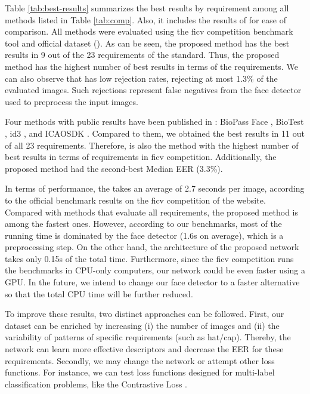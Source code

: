 Table \ref{tab:best-results} summarizes the best results by requirement among all methods listed in Table \ref{tab:comp}. Also, it includes the results of \methodname for ease of comparison. All methods were evaluated using the \acs{ficv} competition benchmark tool and official dataset (\ficvofficial). As can be seen, the proposed method has the best results in 9 out of the 23 requirements of the \icao standard. Thus, the proposed method has the highest number of best results in terms of the requirements. We can also observe that \methodname has low rejection rates, rejecting at most 1.3\% of the evaluated images. Such rejections represent false negatives from the face detector used to preprocess the input images.
 

 
Four methods with public results have been published in \fvcongoing: BioPass Face \citep{fvcVsoft}, BioTest \citep{fvcBioTest}, id3 \citep{fvcICAOCompliance}, and ICAOSDK \citep{fvcSeamfix}. Compared to them, we obtained the best results in 11 out of all 23 requirements. Therefore, \methodname is also the method with the highest number of best results in terms of requirements in \acs{ficv} competition. Additionally, the proposed method had the second-best Median EER (3.3\%).
 
In terms of performance, the \methodname takes an average of 2.7 seconds per image, according to the official benchmark results on the \acs{ficv} competition of the \fvcongoing website. Compared with methods that evaluate all requirements, the proposed method is among the fastest ones. However, according to our benchmarks, most of the running time is dominated by the face detector (1.6s on average), which is a preprocessing step. On the other hand, the architecture of the proposed network takes only 0.15s of the total time. Furthermore, since the \acs{ficv} competition runs the benchmarks in CPU-only computers, our network could be even faster using a GPU. In the future, we intend to change our face detector to a faster alternative so that the total CPU time will be further reduced.
 
To improve these results, two distinct approaches can be followed. First, our dataset can be enriched by increasing (i) the number of images and (ii) the variability of patterns of specific requirements (such as hat/cap). Thereby, the network can learn more effective descriptors and decrease the EER for these requirements. Secondly, we may change the network or attempt other loss functions. For instance, we can test loss functions designed for multi-label classification problems, like the Contrastive Loss \citep{khosla2020supervised}.

